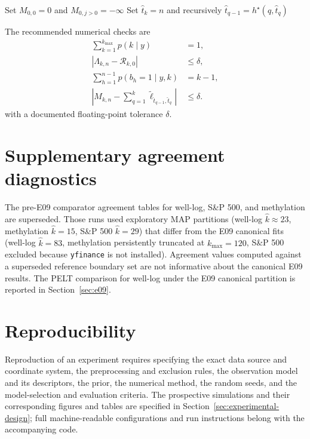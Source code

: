 \begin{algorithm}[H]
\caption{Joint-MAP max-sum and backtracking}
\label{alg:max-sum-app}
Set $M_{0,0}=0$ and $M_{0,j>0}=-\infty$\;
Set $\widehat t_k=n$ and recursively $\widehat t_{q-1}=h^\star(q,\widehat t_q)$\;
\end{algorithm}

The recommended numerical checks are
\begin{align*}
\sum_{k=1}^{k_{\max}}p(k\mid y)&=1,\\
|\Lambda_{k,n}-\mathcal R_{k,0}|&\le\delta,\\
\sum_{h=1}^{n-1}p(b_h=1\mid y,k)&=k-1,\\
\left|M_{k,n}-\sum_{q=1}^{k}
\widetilde\ell_{\widehat t_{q-1},\widehat t_q}\right|&\le\delta.
\end{align*}
with a documented floating-point tolerance $\delta$.

\section{Supplementary agreement diagnostics}
\label{app:agreement}

The pre-E09 comparator agreement tables for well-log, S\&P 500, and methylation are superseded. Those runs used exploratory MAP partitions (well-log $\hat{k}\approx23$, methylation $\hat{k}=15$, S\&P 500 $\hat{k}=29$) that differ from the E09 canonical fits (well-log $\hat{k}=83$, methylation persistently truncated at $k_{\max}=120$, S\&P 500 excluded because \texttt{yfinance} is not installed). Agreement values computed against a superseded reference boundary set are not informative about the canonical E09 results. The PELT comparison for well-log under the E09 canonical partition is reported in Section~\ref{sec:e09}.

\section{Reproducibility}
\label{app:reproducibility}
Reproduction of an experiment requires specifying the exact data source and
coordinate system, the preprocessing and exclusion rules, the observation
model and its descriptors, the prior, the numerical method, the random seeds,
and the model-selection and evaluation criteria. The prospective simulations
and their corresponding figures and tables are specified in
Section~\ref{sec:experimental-design}; full machine-readable configurations
and run instructions belong with the accompanying code.
